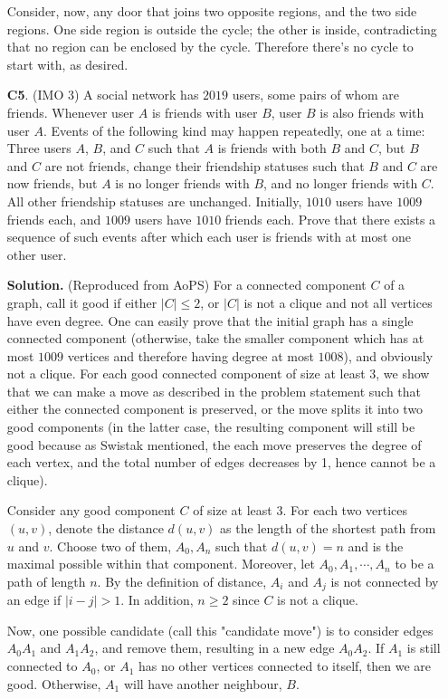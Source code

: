 \documentclass[11pt,a4paper]{article}
\begin{document}
\begin{enumerate}
	Consider, now, any door that joins two opposite regions, and the two side regions. One side region is outside the cycle; the other is inside, contradicting that no region can be enclosed by the cycle. Therefore there's no cycle to start with, as desired. 
	
	
	\item [\textbf{C5}.] (IMO 3) A social network has $2019$ users, some pairs of whom are friends. Whenever user $A$ is friends with user $B$, user $B$ is also friends with user $A$. Events of the following kind may happen repeatedly, one at a time:
	Three users $A$, $B$, and $C$ such that $A$ is friends with both $B$ and $C$, but $B$ and $C$ are not friends, change their friendship statuses such that $B$ and $C$ are now friends, but $A$ is no longer friends with $B$, and no longer friends with $C$. All other friendship statuses are unchanged.
	Initially, $1010$ users have $1009$ friends each, and $1009$ users have $1010$ friends each. Prove that there exists a sequence of such events after which each user is friends with at most one other user.
	
	\textbf{Solution.} (Reproduced from AoPS) For a connected component $C$ of a graph, call it good if either $|C|\le 2$, or $|C|$ is not a clique and not all vertices have even degree. One can easily prove that the initial graph has a single connected component (otherwise, take the smaller component which has at most $1009$ vertices and therefore having degree at most $1008$), and obviously not a clique. For each good connected component of size at least 3, we show that we can make a move as described in the problem statement such that either the connected component is preserved, or the move splits it into two good components (in the latter case, the resulting component will still be good because as Swistak mentioned, the each move preserves the degree of each vertex, and the total number of edges decreases by 1, hence cannot be a clique).
	
	Consider any good component $C$ of size at least 3. For each two vertices $(u, v)$, denote the distance $d(u, v)$ as the length of the shortest path from $u$ and $v$. Choose two of them, $A_0, A_n$ such that $d(u, v)=n$ and is the maximal possible within that component. Moreover, let $A_0, A_1, \cdots , A_n$ to be a path of length $n$. By the definition of distance, $A_i$ and $A_j$ is not connected by an edge if $|i-j|>1$. In addition, $n\ge 2$ since $C$ is not a clique.
	
	Now, one possible candidate (call this "candidate move") is to consider edges $A_0A_1$ and $A_1A_2$, and remove them, resulting in a new edge $A_0A_2$. If $A_1$ is still connected to $A_0$, or $A_1$ has no other vertices connected to itself, then we are good. Otherwise, $A_1$ will have another neighbour, $B$.
	

\end{enumerate}
\end{document}

